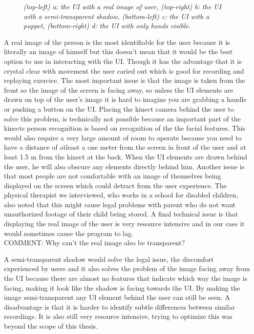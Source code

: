 \begin{figure}[H]
\begin{center}
 		\caption{\emph{(top-left) a: the UI with a real image of user, (top-right) b: the UI with a semi-transparent shadow, (bottom-left) c: the UI with a puppet, (bottom-right) d: the UI with only hands visible. }}
 		\label{user visualizations}
 	\end{center}
 \end{figure}
 
 
 A real image of the person is the most identifiable for the user because it is literally an image of himself but this doesn't mean that it would be the best option to use in interacting with the UI. Though it has the advantage that it is crystal clear with movement the user caried out which is good for recording and replaying exercice. The most important issue is that the image is taken from the front so the image of the screen is facing away, so unless the UI elements are drawn on top of the user's image it is hard to imagine you are grabbing a handle or pushing a button on the UI. Placing the kinect camera behind the user to solve this problem, is technically not possible because an important part of the kinects person recognition is based on recognition of the the facial features. This would also require a very large amount of room to operate because you need to have a distance of atleast a one meter from the screen in front of the user and at least 1.5 m from the kinect at the back. When the UI elements are drawn behind the user, he will also obscure any elements directly behind him. Another issue is that most people are not comfortable with an image of themselves being displayed on the screen which could detract from the user experience. The physical therapist we interviewed, who works in a school for disabled children, also noted that this might cause legal problems with parent who do not want unauthorized footage of their child being stored. A final technical issue is that displaying the real image of the user is very resource intensive and in our case it would sometimes cause the program to lag. \\
 {\large COMMENT: Why can't the real image also be transparent?}
 
 A semi-transparent shadow would solve the legal issue, the discomfort experienced by users and it also solves the problem of the image facing away from the UI because there are almost no features that indicate which way the image is facing, making it look like the shadow is facing towards the UI. By making the image semi-transparent any UI element behind the user can still be seen. A disadvantage is that it is harder to identify subtle differences between similar recordings. It is also still very resource intensive, trying to optimize this was beyond the scope of this thesis.
 
